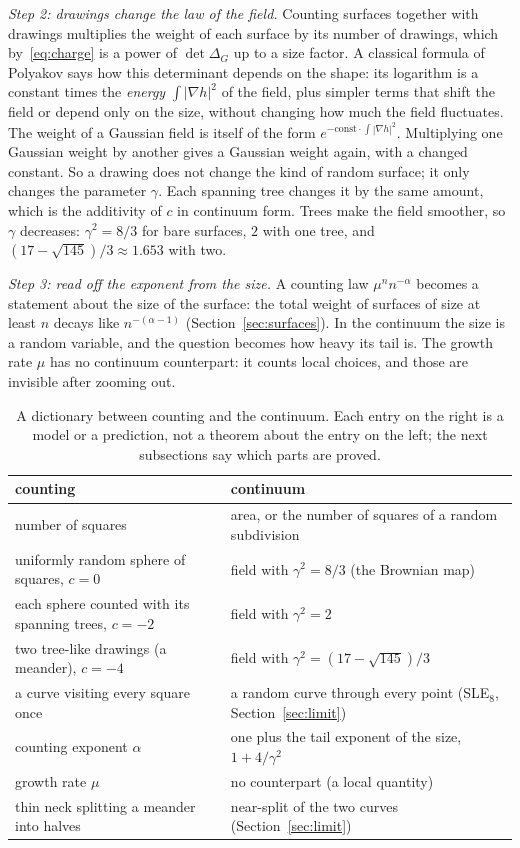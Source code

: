 \emph{Step 2: drawings change the law of the field.} Counting surfaces together with drawings
multiplies the weight of each surface by its number of drawings, which by~\eqref{eq:charge} is a
power of $\det\Delta_G$ up to a size factor. A classical formula of Polyakov says how this
determinant depends on the shape: its logarithm is a constant times the \emph{energy}
$\int|\nabla h|^2$ of the field, plus simpler terms that shift the field or depend only on the
size, without changing how much the field fluctuates. The weight of a Gaussian
field is itself of the form $e^{-\text{const}\cdot\int|\nabla h|^2}$. Multiplying one Gaussian
weight by another gives a Gaussian weight again, with a changed constant. So a drawing does not
change the kind of random surface; it only changes the parameter $\gamma$. Each spanning tree
changes it by the same amount, which is the additivity of $c$ in continuum form. Trees make the
field smoother, so $\gamma$ decreases: $\gamma^2=8/3$ for bare surfaces, $2$ with one tree, and
$(17-\sqrt{145})/3\approx1.653$ with two.

\emph{Step 3: read off the exponent from the size.} A counting law $\mu^n n^{-\alpha}$ becomes
a statement about the size of the surface: the total weight of surfaces of size at least $n$
decays like $n^{-(\alpha-1)}$ (Section~\ref{sec:surfaces}). In the continuum the size is a random
variable, and the question becomes how heavy its tail is. The growth rate $\mu$ has no continuum
counterpart: it counts local choices, and those are invisible after zooming out.

\begin{table}[ht]
\centering
\small
\renewcommand{\arraystretch}{1.15}
\begin{tabular}{p{}p{}}
\toprule
counting & continuum \\
\midrule
number of squares & area, or the number of squares of a random subdivision \\
uniformly random sphere of squares, $c=0$ & field with $\gamma^2=8/3$ (the Brownian map) \\
each sphere counted with its spanning trees, $c=-2$ & field with $\gamma^2=2$ \\
two tree-like drawings (a meander), $c=-4$ & field with $\gamma^2=(17-\sqrt{145})/3$ \\
a curve visiting every square once & a random curve through every point (SLE$_8$, Section~\ref{sec:limit}) \\
counting exponent $\alpha$ & one plus the tail exponent of the size, $1+4/\gamma^2$ \\
growth rate $\mu$ & no counterpart (a local quantity) \\
thin neck splitting a meander into halves & near-split of the two curves (Section~\ref{sec:limit}) \\
\bottomrule
\end{tabular}
\caption{A dictionary between counting and the continuum. Each entry on the right is a model or a
prediction, not a theorem about the entry on the left; the next subsections say which parts are
proved.}
\label{tab:dictionary}
\end{table}

